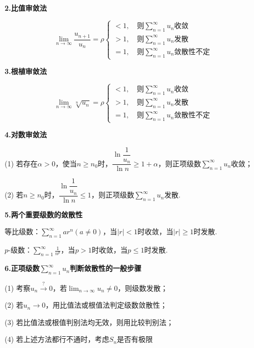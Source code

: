 \textbf{2.比值审敛法}

\begin{equation*}
    \lim_{n\rightarrow\infty}\frac{u_{n+1}}{u_n}=\rho
    \begin{cases}
        <1, \quad \mbox{则}\displaystyle\sum_{n=1}^\infty u_n\mbox{收敛}\\
        >1, \quad \mbox{则}\displaystyle\sum_{n=1}^\infty u_n\mbox{发散}\\
        =1, \quad \mbox{则}\displaystyle\sum_{n=1}^\infty u_n\mbox{敛散性不定}
    \end{cases}
\end{equation*}

\textbf{3.根植审敛法}

\begin{equation*}
    \lim_{n\rightarrow\infty}\sqrt[n]{u_n}=\rho
    \begin{cases}
        <1, \quad \mbox{则}\displaystyle\sum_{n=1}^\infty u_n\mbox{收敛}\\
        >1, \quad \mbox{则}\displaystyle\sum_{n=1}^\infty u_n\mbox{发散}\\
        =1, \quad \mbox{则}\displaystyle\sum_{n=1}^\infty u_n\mbox{敛散性不定}
    \end{cases}
\end{equation*}

\textbf{4.对数审敛法}

(1) 若存在$\alpha>0$，使当$n\geq n_0$时，$\dfrac{\ln\dfrac{1}{u_n}}{\ln n}\geq 1+\alpha$，则正项级数$\displaystyle\sum_{n=1}^\infty u_n$收敛；

(2) 若$n\geq n_0$时，$\dfrac{\ln\dfrac{1}{u_n}}{\ln n}\leq 1$，则正项级数$\displaystyle\sum_{n=1}^\infty u_n$发散.

\textbf{5.两个重要级数的敛散性}

等比级数：$\displaystyle\sum_{n=1}^\infty ar^n(a\neq0)$，当$|r|<1$时收敛，当$|r|\geq 1$时发散.

$p$-级数：$\displaystyle\sum_{n=1}^\infty \frac{1}{n^p}$，当$p>1$时收敛，当$p\leq 1$时发散.

\textbf{6.正项级数$\displaystyle\sum_{n=1}^\infty u_n$判断敛散性的一般步骤}

(1) 考察$u_n\xrightarrow{?}0$，若$\displaystyle\lim_{n\rightarrow\infty}u_n\neq 0$，则级数发散；

(2) 若$u_n\rightarrow0$，用比值法或根值法判定级数敛散性；

(3) 若比值法或根值判别法均无效，则用比较判别法；

(4) 若上述方法都行不通时，考虑$S_n$是否有极限

